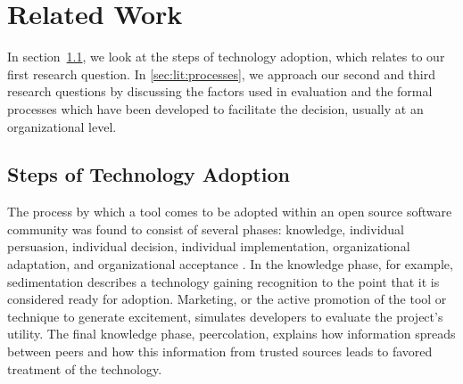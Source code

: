 \section{Related Work}
  In section~\ref{sec:tech-adoption}, we look at the steps of technology adoption, which relates to our first research question. In \sec\ref{sec:lit:processes}, we approach our second and third research questions by discussing the factors used in evaluation and the formal processes which have been developed to facilitate the decision, usually at an organizational level. 
\subsection{Steps of Technology Adoption} %
\label{sec:tech-adoption}
The process by which a tool comes to be adopted within an open source software community was found to consist of several phases: knowledge, individual persuasion, individual decision, individual implementation, organizational adaptation, and organizational acceptance \cite{krafft:2016:free}. In the knowledge phase, for example, sedimentation describes a technology gaining recognition to the point that it is considered ready for adoption. Marketing, or the active promotion of the tool or technique to generate excitement, simulates developers to evaluate the project's utility. The final knowledge phase, peercolation, explains how information spreads between peers and how this information from trusted sources leads to favored treatment of the technology.



